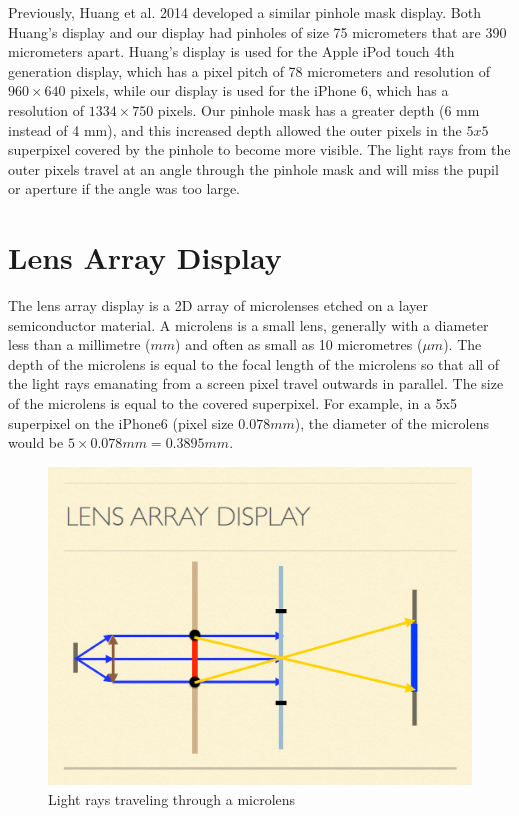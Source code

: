 Previously, Huang et al. 2014 \cite{Huang:2014:VisionCorrectingDisplay} developed a similar pinhole mask display. Both Huang's display and our display had pinholes of size 75 micrometers that are 390 micrometers apart. Huang's display is used for the Apple iPod touch 4th generation display, which has a pixel pitch of 78 micrometers and resolution of $960 \times 640$ pixels, while our display is used for the iPhone 6, which has a resolution of $1334 \times 750$ pixels. Our pinhole mask has a greater depth (6 mm instead of 4 mm), and this increased depth allowed the outer pixels in the $5x5$ superpixel covered by the pinhole to become more visible. The light rays from the outer pixels travel at an angle through the pinhole mask and will miss the pupil or aperture if the angle was too large.


\section{Lens Array Display}

The lens array display is a 2D array of microlenses etched on a layer semiconductor material. A microlens is a small lens, generally with a diameter less than a millimetre ($mm$) and often as small as 10 micrometres ($\mu m$). The depth of the microlens is equal to the focal length of the microlens so that all of the light rays emanating from a screen pixel travel outwards in parallel. The size of the microlens is equal to the covered superpixel. For example, in a 5x5 superpixel on the iPhone6 (pixel size $0.078 mm$), the diameter of the microlens would be $5 \times 0.078mm = 0.3895mm$.  

\begin{figure}[ht]
  \centering
  \includegraphics[width=5.0in]{chapters/chapter3/images/lens_rays.png}
  \caption{Light rays traveling through a microlens \cite{Wu:EECS-2016-67}}
  \label{fig:lens}
\end{figure}


